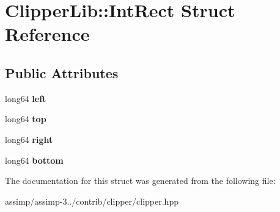 \hypertarget{struct_clipper_lib_1_1_int_rect}{\section{Clipper\+Lib\+:\+:Int\+Rect Struct Reference}
\label{struct_clipper_lib_1_1_int_rect}
}
\subsection*{Public Attributes}
\begin{DoxyCompactItemize}
\item 
\hypertarget{struct_clipper_lib_1_1_int_rect_a11caf77c3b6bde44fbb34107fa61a7a6}{long64 {\bfseries left}}\label{struct_clipper_lib_1_1_int_rect_a11caf77c3b6bde44fbb34107fa61a7a6}

\item 
\hypertarget{struct_clipper_lib_1_1_int_rect_ac5191ac3521b70bdf6fd7efd1f6ad55a}{long64 {\bfseries top}}\label{struct_clipper_lib_1_1_int_rect_ac5191ac3521b70bdf6fd7efd1f6ad55a}

\item 
\hypertarget{struct_clipper_lib_1_1_int_rect_a1403c5dd21df5ec2131996682d47ac0c}{long64 {\bfseries right}}\label{struct_clipper_lib_1_1_int_rect_a1403c5dd21df5ec2131996682d47ac0c}

\item 
\hypertarget{struct_clipper_lib_1_1_int_rect_ae85ebc1e77afcccaabebfead7385c6b8}{long64 {\bfseries bottom}}\label{struct_clipper_lib_1_1_int_rect_ae85ebc1e77afcccaabebfead7385c6b8}

\end{DoxyCompactItemize}


The documentation for this struct was generated from the following file\+:\begin{DoxyCompactItemize}
\item 
assimp/assimp-\/3../contrib/clipper/clipper.\+hpp\end{DoxyCompactItemize}
